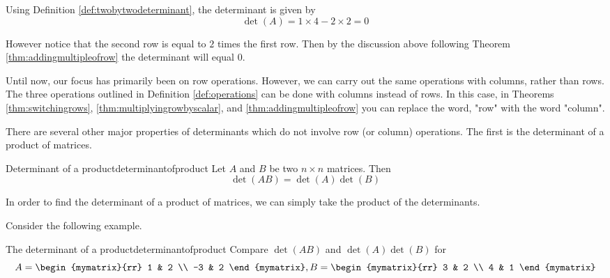 \begin{solution}
Using Definition \ref{def:twobytwodeterminant}, the determinant is given by
\[
\det \left( A \right) = 1 \times 4 - 2 \times 2 = 0
\]

However notice that the second row is equal to $2$ times the first row. Then by the discussion above following Theorem \ref{thm:addingmultipleofrow} the determinant will equal $0$.
\end{solution}

Until now, our focus has primarily been on row operations. However, we can carry out the 
same operations with columns, rather than rows. The three operations outlined in
Definition \ref{def:operations} can be done with columns instead of rows. 
In this case, in Theorems \ref{thm:switchingrows}, \ref{thm:multiplyingrowbyscalar}, 
and \ref{thm:addingmultipleofrow} you can replace
the word, "row" with the word "column".

There are several other major properties of determinants which do not involve
row (or column) operations. The first is the determinant of a product of matrices. 

\begin{theorem}{Determinant of a product}{determinantofproduct}
Let $A$ and $B$ be two $n\times n$ matrices. Then
\begin{equation*}
\det \left( AB\right) =\det \left( A\right) \det \left( B\right)
\end{equation*}
\end{theorem}

In order to find the determinant of a product of matrices, we can simply take the product of the determinants. 

Consider the following example.

\begin{example}{The determinant of a product}{determinantofproduct}
Compare $\det \left( AB\right) $ and $\det \left( A\right) \det \left(
B\right) $ for
\begin{equation*}
A=\begin{mymatrix}{rr}
1 & 2 \\
-3 & 2
\end{mymatrix} ,B=\begin{mymatrix}{rr}
3 & 2 \\
4 & 1
\end{mymatrix} 
\end{equation*}
\end{example}

